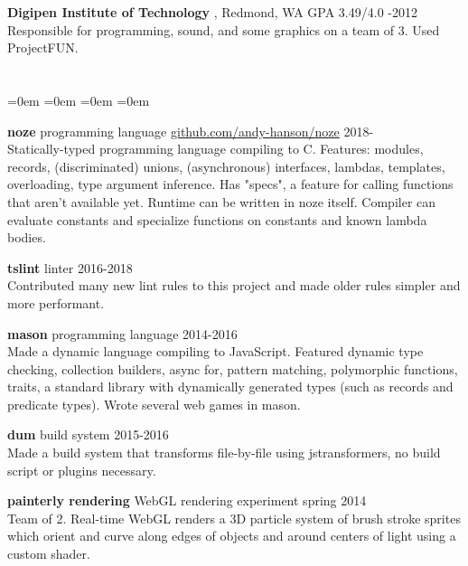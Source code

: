 \documentclass[margin]{res}
\newcommand{\sex}[1]{\section{\fontsize{13}{13}\selectfont{#1}}}
\newcommand{\tit}[1]{{
	\fontsize{11}{12}
	\selectfont
	\textbf{#1}
}}
\newenvironment{noindlist}
	{\begin{list}{}{
		\labelsep=0em \labelwidth=0em \leftmargin=0em \itemindent=0em
		\itemsep=3pt
	}}
	{\end{list}}
\begin{document}
\begin{resume}
	\tit{Digipen Institute of Technology}, Redmond, WA \hfill \textsf{GPA 3.49/4.0 -2012} \\
	Responsible for programming, sound, and some graphics on a team of 3. Used ProjectFUN.

\sex{code}
	\begin{noindlist}
	
	\item \tit{noze} \enspace \small{programming language} \enspace \url{github.com/andy-hanson/noze} \hfill \textsf{2018-} \\
	Statically-typed programming language compiling to C.
	Features: modules, records, (discriminated) unions, (asynchronous) interfaces, lambdas, templates, overloading, type argument inference.
	Has "specs", a feature for calling functions that aren't available yet.
	Runtime can be written in noze itself.
	Compiler can evaluate constants and specialize functions on constants and known lambda bodies.	
	
	\item \tit{tslint} \enspace \small{linter} \hfill \textsf{2016-2018} \\
	Contributed many new lint rules to this project and made older rules simpler and more performant.
	
	\item \tit{mason} \enspace \small{programming language} \hfill \textsf{2014-2016} \\
	Made a dynamic language compiling to JavaScript. Featured dynamic type checking, collection builders, async for, pattern matching, polymorphic functions, traits, a standard library with dynamically generated types (such as records and predicate types). Wrote several web games in mason.
	
	\item \tit{dum} \enspace \small{build system} \hfill \textsf{2015-2016} \\
	Made a build system that transforms file-by-file using jstransformers, no build script or plugins necessary.

	\item \tit{painterly rendering} \enspace \small{WebGL rendering experiment} \hfill \textsf{spring 2014} \\
	Team of 2. Real-time WebGL renders a 3D particle system of brush stroke sprites which orient and curve along edges of objects and around centers of light using a custom shader.


\end{noindlist}
\end{resume}
\end{document}
